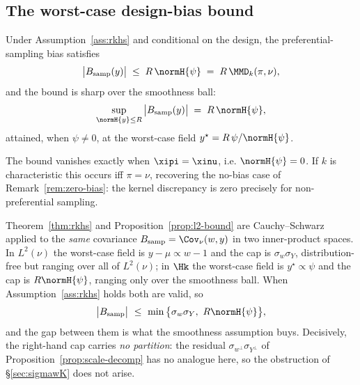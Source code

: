 \subsection{The worst-case design-bias bound}
\label{sec:rkhs-bound}

\begin{theorem}
\label{thm:rkhs}
Under Assumption~\ref{ass:rkhs} and conditional on the design, the
preferential-sampling bias satisfies
\[
  \big|B_{\mathrm{samp}}(y)\big|\;\le\; R\,\normH{\psi}\;=\;R\,\MMD_k(\pi,\nu),
\]
and the bound is sharp over the smoothness ball:
\[
  \sup_{\normH{y}\le R}\big|B_{\mathrm{samp}}(y)\big|\;=\;R\,\normH{\psi},
\]
attained, when $\psi\ne0$, at the worst-case field
$y^{\star}=R\,\psi/\normH{\psi}$.
\end{theorem}

\begin{remark}
\label{rem:rkhs-zero}
The bound vanishes exactly when $\xipi=\xinu$, i.e. $\normH{\psi}=0$. If $k$ is
characteristic \citep{muandet2017} this occurs iff $\pi=\nu$, recovering the
no-bias case of Remark~\ref{rem:zero-bias}: the kernel discrepancy is zero
precisely for non-preferential sampling.
\end{remark}

\begin{remark}
\label{rem:rkhs-vs-l2}
Theorem~\ref{thm:rkhs} and Proposition~\ref{prop:l2-bound} are Cauchy--Schwarz
applied to the \emph{same} covariance $B_{\mathrm{samp}}=\Cov_\nu(w,y)$ in two
inner-product spaces. In $L^2(\nu)$ the worst-case field is $y-\mu\propto w-1$
and the cap is $\sigma_w\sigma_Y$, distribution-free but ranging over all of
$L^2(\nu)$; in $\Hk$ the worst-case field is $y^{\star}\propto\psi$ and the cap
is $R\normH{\psi}$, ranging only over the smoothness ball. When
Assumption~\ref{ass:rkhs} holds both are valid, so
\[
  \big|B_{\mathrm{samp}}\big|\ \le\ \min\big\{\sigma_w\sigma_Y,\ R\normH{\psi}\big\},
\]
and the gap between them is what the smoothness assumption buys. Decisively, the
right-hand cap carries \emph{no partition}: the residual
$\sigma_{w^{\perp}}\sigma_{Y^{\perp}}$ of Proposition~\ref{prop:scale-decomp}
has no analogue here, so the obstruction of \S\ref{sec:sigmawK} does not arise.
\end{remark}

